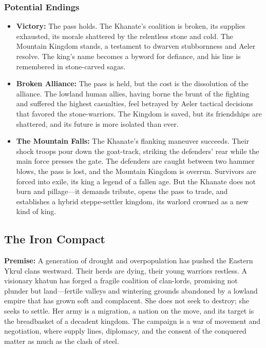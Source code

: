 \documentclass[11pt]{article}
\begin{document}
\subsubsection{Potential Endings}
\begin{itemize}
\item \textbf{Victory:} The pass holds. The Khanate's coalition is broken, its supplies exhausted, its morale shattered by the relentless stone and cold. The Mountain Kingdom stands, a testament to dwarven stubbornness and Aeler resolve. The king's name becomes a byword for defiance, and his line is remembered in stone-carved sagas.
\item \textbf{Broken Alliance:} The pass is held, but the cost is the dissolution of the alliance. The lowland human allies, having borne the brunt of the fighting and suffered the highest casualties, feel betrayed by Aeler tactical decisions that favored the stone-warriors. The Kingdom is saved, but its friendships are shattered, and its future is more isolated than ever.
\item \textbf{The Mountain Falls:} The Khanate's flanking maneuver succeeds. Their shock troops pour down the goat-track, striking the defenders' rear while the main force presses the gate. The defenders are caught between two hammer blows, the pass is lost, and the Mountain Kingdom is overrun. Survivors are forced into exile, its king a legend of a fallen age. But the Khanate does not burn and pillage—it demands tribute, opens the pass to trade, and establishes a hybrid steppe-settler kingdom, its warlord crowned as a new kind of king.
\end{itemize}

\subsection{The Iron Compact}

\textbf{Premise:} A generation of drought and overpopulation has pushed the Eastern Ykrul clans westward. Their herds are dying, their young warriors restless. A visionary khatun has forged a fragile coalition of clan-lords, promising not plunder but land—fertile valleys and wintering grounds abandoned by a lowland empire that has grown soft and complacent. She does not seek to destroy; she seeks to settle. Her army is a migration, a nation on the move, and its target is the breadbasket of a decadent kingdom. The campaign is a war of movement and negotiation, where supply lines, diplomacy, and the consent of the conquered matter as much as the clash of steel.
\end{document}
